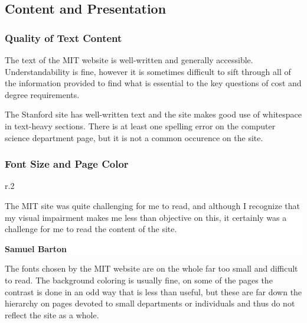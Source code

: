 \begin{FlushLeft}
\section*{Content and Presentation}

\subsubsection*{Quality of Text Content}

The text of the MIT website is well-written and generally accessible. Understandability is
fine, however it is sometimes difficult to sift through all of the information provided to
find what is essential to the key questions of cost and degree requirements.

The Stanford site has well-written text and the site makes good use of whitespace
in text-heavy sections. There is at least one spelling error on the computer science
department page, but it is not a common occurence on the site.
\end{FlushLeft}

\subsubsection*{Font Size and Page Color}



\linespread{1.0}
\begin{wrapfigure}[6]{r}{.2\textwidth}
\colorbox{white}{\begin{minipage}{0.25\textwidth}\begin{scriptsize}\begin{center}
			 	   The MIT site was quite challenging for me to read, and although I recognize that my visual impairment makes me less
				   than objective on this, it certainly was a challenge for me to read the content of the site.\par

				   \textbf{Samuel Barton}\end{center}\end{scriptsize}
\end{minipage}}
\end{wrapfigure}

\linespread{1.3}
		The fonts chosen by the MIT website are on the whole far too small and difficult to read.
		The background coloring is usually fine, on some of the pages the contrast is done in an
		odd way that is less than useful, but these are far down the hierarchy on pages devoted to
		small departments or individuals and thus do not reflect the site as a whole.

